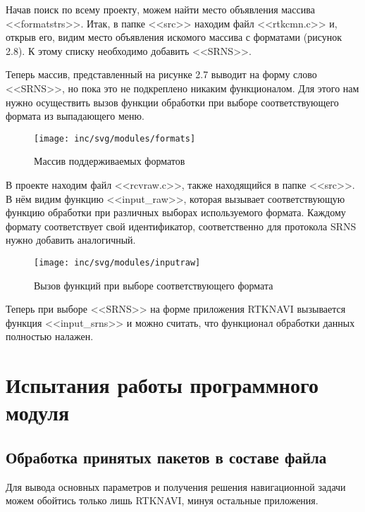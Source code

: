 Начав поиск по всему проекту, можем найти место объявления массива <<formatstrs>>. Итак, в папке <<src>>  находим файл <<rtkcmn.c>> и, открыв его, видим место объявления искомого массива с форматами (рисунок 2.8). К этому списку необходимо добавить <<SRNS>>.

Теперь массив, представленный на рисунке 2.7 выводит на форму слово <<SRNS>>, но пока это не подкреплено никаким функционалом. Для этого нам нужно осуществить вызов функции обработки при выборе соответствующего формата из выпадающего меню.
\begin{figure}[ht]
	\centering
	\texttt{[image: inc/svg/modules/formats]}
	\caption{Массив поддерживаемых форматов}
	\label{fig:formats}
\end{figure}

В проекте находим файл <<rcvraw.c>>, также находящийся в папке <<src>>. В нём видим функцию <<input\_raw>>, которая вызывает соответствующую функцию обработки при различных выборах используемого формата. Каждому формату соответствует свой идентификатор, соответственно для протокола SRNS нужно добавить аналогичный.
\begin{figure}[ht]
	\centering
	\texttt{[image: inc/svg/modules/inputraw]}
	\caption{Вызов функций при выборе соответствующего формата}
	\label{fig:inputraw}
\end{figure}

Теперь при выборе <<SRNS>> на форме приложения RTKNAVI вызывается функция <<input\_srns>> и можно считать, что функционал обработки данных полностью налажен.

\chapter{Испытания работы программного модуля}
\label{cha:testing}
\section{Обработка принятых пакетов в составе файла}

Для вывода основных параметров и получения решения навигационной задачи можем обойтись только лишь RTKNAVI, минуя остальные приложения.

